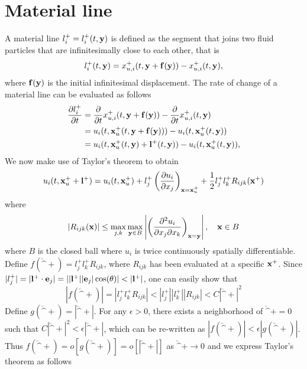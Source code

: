\documentclass[oneside,a4paper,11pt]{report}
\begin{document}
\section{Material line}
A material line $l^+_i = l^+_i(t, \mathbf{y})$ is defined as the segment that joins two fluid particles that are infinitesimally close to each other, that is
\begin{equation}
\label{eq:material_line}
l^+_i(t,\mathbf{y}) = x_{u,i}^+(t,\mathbf{y} + \mathbf{f}(\mathbf{y})) - x_{u,i}^+(t,\mathbf{y}),
\end{equation}
where $\mathbf{f}(\mathbf{y})$ is the initial infinitesimal displacement. The rate of change of a material line can be evaluated as follows
\begin{align}
\frac{\partial l_i^+ }{\partial t} & = \frac{\partial}{\partial t} x_{u,i}^+(t,\mathbf{y} + \mathbf{f}(\mathbf{y})) - \frac{\partial}{\partial t} x_{u,i}^+(t,\mathbf{y}) \nonumber \\
& = u_i(t,\mathbf{x}_u^+(t,\mathbf{y} + \mathbf{f}(\mathbf{y}))) - u_i(t,\mathbf{x}_u^+(t,\mathbf{y})) \nonumber \\
& = u_i(t,\mathbf{x}_u^+(t,\mathbf{y}) + \mathbf{l}^+(t,\mathbf{y})) - u_i(t,\mathbf{x}_u^+(t,\mathbf{y})),
\end{align}
We now make use of Taylor's theorem to obtain
\begin{equation}
u_i(t,\mathbf{x}^+_u + \mathbf{l}^+) = u_i(t,\mathbf{x}^+_u) + l_j^+\left ( \frac{\partial u_i}{\partial x_j} \right )_{\mathbf{x} = \mathbf{x}^+_u} + \frac{1}{2} l^+_j l^+_k R_{ijk}(\mathbf{x}^+)
\end{equation} 
where 
\begin{equation}
|R_{ijk}(\mathbf{x})| \le \max_{j,k} \max_{\mathbf{y} \in B} \left | \left ( \frac{\partial^2 u_i}{\partial x_j \partial x_k} \right)_{\mathbf{x} = \mathbf{y}} \right |, \quad \mathbf{x} \in B
\end{equation}
where $B$ is the closed ball where $u_i$ is twice continuously spatially differentiable. Define $f(\lvec^+) = l^+_jl^+_kR_{ijk}$, where $R_{ijk}$ has been evaluated at a specific $\mathbf{x}^+$. Since $|l^+_j| = |\mathbf{l}^+ \cdot \mathbf{e}_j | = ||\mathbf{l}^+| |\mathbf{e}_j| \cos(\theta)| < |\mathbf{l}^+|$, one can easily show that 
\begin{equation}
|f(\lvec^+)| = |l^+_j l^+_k R_{ijk}| < |l^+_j| |l^+_k| |R_{ijk}| < C |\lvec^+|^2
\end{equation}
Define $g(\lvec^+) = |\lvec^+|$. For any $\epsilon > 0$, there exists a neighborhood of $\lvec^+ = 0$ such that $C |\lvec^+|^2 < \epsilon |\lvec^+|$, which can be re-written as $|f(\lvec^+) | <  \epsilon |g(\lvec^+)|$. Thus $f(\lvec^+) = o[g(\lvec^+)] = o[|\lvec^+|]$ as $\lvec^+ \to 0$ and we express Taylor's theorem as follows
\end{document}
